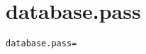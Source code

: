 \section{database.pass}
\label{configuration:DatabasePass}
\AvailableInJavaOnly{\TODO}
\begin{lstlisting}[style=Props,caption={Usage example for \textit{database.pass}}]
database.pass=
\end{lstlisting}